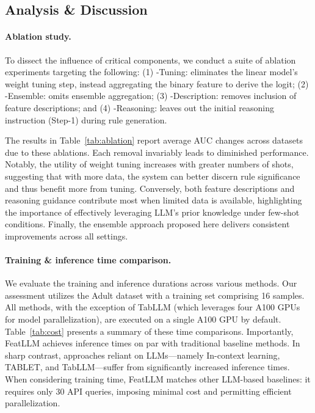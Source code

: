 \subsection{Analysis \& Discussion}
\label{sec:analysis}
\paragraph{Ablation study.} To dissect the influence of critical components, we conduct a suite of ablation experiments targeting the following: (1) \textsf{-Tuning}: eliminates the linear model’s weight tuning step, instead aggregating the binary feature to derive the logit; (2) \textsf{-Ensemble}: omits ensemble aggregation; (3) \textsf{-Description}: removes inclusion of feature descriptions; and (4) \textsf{-Reasoning}: leaves out the initial reasoning instruction (Step-1) during rule generation.

The results in Table~\ref{tab:ablation} report average AUC changes across datasets due to these ablations. Each removal invariably leads to diminished performance. Notably, the utility of weight tuning increases with greater numbers of shots, suggesting that with more data, the system can better discern rule significance and thus benefit more from tuning. Conversely, both feature descriptions and reasoning guidance contribute most when limited data is available, highlighting the importance of effectively leveraging LLM’s prior knowledge under few-shot conditions. Finally, the ensemble approach proposed here delivers consistent improvements across all settings.

\vspace*{-0.12in}
\paragraph{Training \& inference time comparison.} We evaluate the training and inference durations across various methods. Our assessment utilizes the Adult dataset with a training set comprising 16 samples. All methods, with the exception of TabLLM (which leverages four A100 GPUs for model parallelization), are executed on a single A100 GPU by default. Table~\ref{tab:cost} presents a summary of these time comparisons. Importantly, \textsf{FeatLLM} achieves inference times on par with traditional baseline methods. In sharp contrast, approaches reliant on LLMs—namely In-context learning, TABLET, and TabLLM—suffer from significantly increased inference times. When considering training time, \textsf{FeatLLM} matches other LLM-based baselines: it requires only 30 API queries, imposing minimal cost and permitting efficient parallelization.

